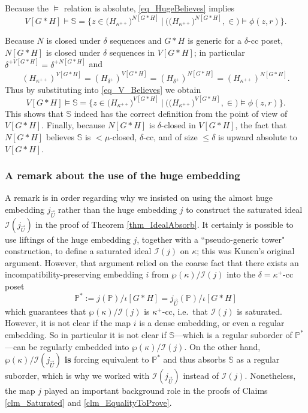 \documentclass{amsart}
\begin{document}
Because the $\models$ relation is absolute, \eqref{eq_HugeBelieves} implies
\begin{equation}\label{eq_V_Believes}
V[G*H] \models \mathbb{S} = \{ z \in \big( H_{\kappa^{++}}\big)^{N[G*H]} \ | \  \Big( \big( H_{\kappa^{++}}\big)^{N[G*H]}, \in \Big) \models \phi(z,r)   \}.
\end{equation}


Because $N$ is closed under $\delta$ sequences and $G*H$ is generic for a $\delta$-cc poset, $N[G*H]$ is closed under $\delta$ sequences in $V[G*H]$; in particular $\delta^{+V[G*H]} = \delta^{+N[G*H]}$ and
\begin{equation}
(H_{\kappa^{++}})^{V[G*H]} = (H_{\delta^+})^{V[G*H]} =(H_{\delta^+})^{N[G*H]}  =  (H_{\kappa^{++}})^{N[G*H]}.
\end{equation}
Thus by substituting into \eqref{eq_V_Believes} we obtain
\begin{equation}
V[G*H] \models \mathbb{S} = \{ z \in \big( H_{\kappa^{++}}\big)^{V[G*H]} \ | \  \Big( \big( H_{\kappa^{++}}\big)^{V[G*H]}, \in \Big) \models \phi(z,r)   \}.
\end{equation}
This shows that $\mathbb{S}$ indeed has the correct definition from the point of view of $V[G*H]$.  Finally, because $N[G*H]$ is $\delta$-closed in $V[G*H]$, the fact that $N[G*H]$ believes $\mathbb{S}$ is $<\mu$-closed, $\delta$-cc, and of size $\le \delta$ is upward absolute to $V[G*H]$.  


\subsubsection{A remark about the use of the huge embedding}\label{sec_HugeVersusAH}

A remark is in order regarding why we insisted on using the almost huge embedding $j_{\vec{U}}$ rather than the huge embedding $j$ to construct the saturated ideal $\mathcal{I}(j_{\vec{U}})$ in the proof of Theorem \ref{thm_IdealAbsorb}.  It certainly is possible to use liftings of the huge embedding $j$, together with a ``pseudo-generic tower" construction, to define a saturated ideal $\mathcal{I}(j)$ on $\kappa$; this was Kunen's original argument.  However, that argument relied on the coarse fact that there exists an incompatibility-preserving embedding $i$ from $\wp(\kappa)/\mathcal{I}(j)$ into the $\delta=\kappa^+$-cc poset 
\[
\mathbb{P}^*:= j(\mathbb{P})/\iota[G*H] = j_{\vec{U}}(\mathbb{P})/\iota[G*H]
\]
which guarantees that $\wp(\kappa)/\mathcal{I}(j)$ is $\kappa^+$-cc, i.e.\ that $\mathcal{I}(j)$ is saturated.  However, it is not clear if the map $i$ is a dense embedding, or even a regular embedding.  So in particular it is not clear if $\mathbb{S}$---which is a regular suborder of $\mathbb{P}^*$---can be regularly embedded into $\wp(\kappa)/\mathcal{I}(j)$.  On the other hand, $\wp(\kappa)/\mathcal{I}(j_{\vec{U}})$ \textbf{is} forcing equivalent to $\mathbb{P}^*$ and thus absorbs $\mathbb{S}$ as a regular suborder, which is why we worked with $\mathcal{I}(j_{\vec{U}})$ instead of $\mathcal{I}(j)$.  Nonetheless, the map $j$ played an important background role in the proofs of Claims \ref{clm_Saturated} and \ref{clm_EqualityToProve}.  
\end{document}
